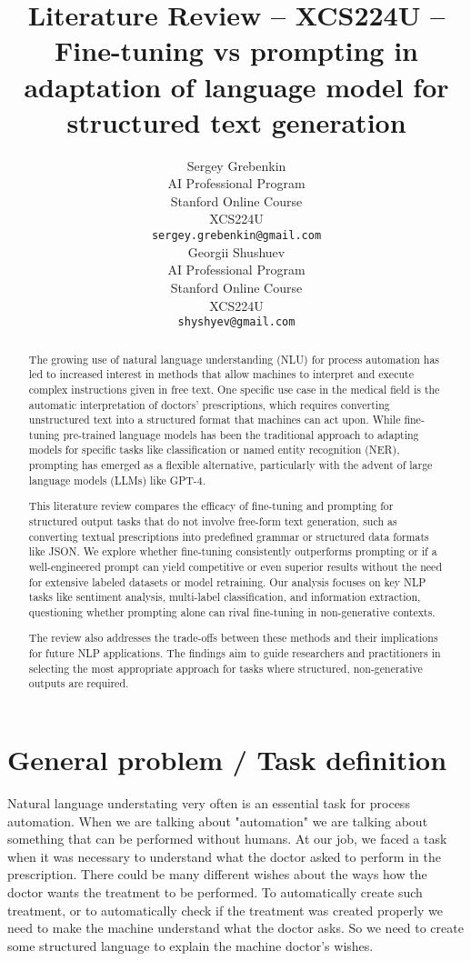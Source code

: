 \documentclass[11pt]{article}
\title{Literature Review – XCS224U – Fine-tuning vs prompting in adaptation of language model for structured text generation}
\author{Sergey Grebenkin \\
  AI Professional Program \\
  Stanford Online Course \\
  XCS224U \\
  {\tt sergey.grebenkin@gmail.com} \\\And
  Georgii Shushuev \\
  AI Professional Program \\
  Stanford Online Course \\
  XCS224U \\
  {\tt shyshyev@gmail.com} \\}
\date{}
\begin{document}
\maketitle
\begin{abstract}
The growing use of natural language understanding (NLU) for process automation has led to increased interest in methods that allow machines to interpret and execute complex instructions given in free text. One specific use case in the medical field is the automatic interpretation of doctors' prescriptions, which requires converting unstructured text into a structured format that machines can act upon. While fine-tuning pre-trained language models has been the traditional approach to adapting models for specific tasks like classification or named entity recognition (NER), prompting has emerged as a flexible alternative, particularly with the advent of large language models (LLMs) like GPT-4.

This literature review compares the efficacy of fine-tuning and prompting for structured output tasks that do not involve free-form text generation, such as converting textual prescriptions into predefined grammar or structured data formats like JSON. We explore whether fine-tuning consistently outperforms prompting or if a well-engineered prompt can yield competitive or even superior results without the need for extensive labeled datasets or model retraining. Our analysis focuses on key NLP tasks like sentiment analysis, multi-label classification, and information extraction, questioning whether prompting alone can rival fine-tuning in non-generative contexts.

The review also addresses the trade-offs between these methods and their implications for future NLP applications. The findings aim to guide researchers and practitioners in selecting the most appropriate approach for tasks where structured, non-generative outputs are required.
\end{abstract}

\section{General problem / Task definition}
  
Natural language understating very often is an essential task for process automation. When we are talking about "automation" we are talking about something that can be performed without humans. At our job, we faced a task when it was necessary to understand what the doctor asked to perform in the prescription. There could be many different wishes about the ways how the doctor wants the treatment to be performed. To automatically create such treatment, or to automatically check if the treatment was created properly we need to make the machine understand what the doctor asks. So we need to create some structured language to explain the machine doctor's wishes. 
\end{document}
